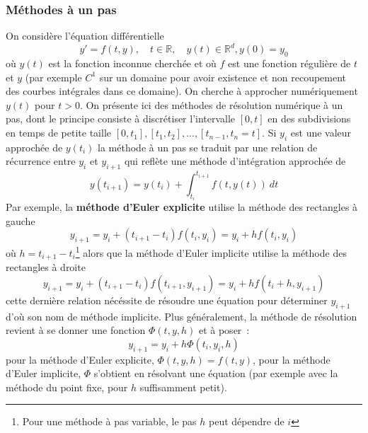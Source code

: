 \documentclass[a4paper,11pt]{article}
\newcommand{\R}{{\mathbb{R}}}
\begin{document}
\begin{giacjshere}
\subsubsection{Méthodes à un pas}
On considère l'équation différentielle 
$$y'=f(t,y), \quad t \in \R, \quad y(t) \in \R^d, y(0)=y_0$$ 
o\`u $y(t)$ est la fonction inconnue cherchée
et où $f$ est une fonction régulière de $t$ et $y$ (par exemple
$C^1$ sur un domaine pour avoir existence et non recoupement des courbes
int\'egrales dans ce domaine).  On cherche
à approcher numériquement $y(t)$ pour $t>0$. 
On présente ici des méthodes de résolution numérique à un pas,
dont le principe consiste à discrétiser l'intervalle $[0,t]$ en des
subdivisions en temps de petite taille $[0,t_1], [t_1,t_2], ..., 
[t_{n-1},t_n=t]$. Si $y_i$ est une valeur approchée de $y(t_i)$
la méthode à un pas se traduit par une relation de récurrence entre
$y_i$ et $y_{i+1}$ qui reflète une méthode d'intégration
approchée de
$$ y(t_{i+1})=y(t_i)+\int_{t_i}^{t_{i+1}} f(t,y(t)) \ dt$$
Par exemple, la {\bf méthode d'Euler explicite} 
utilise la méthode des
rectangles à gauche
$$ y_{i+1} = y_i + (t_{i+1}-t_i) f(t_i,y_i)=y_i+hf(t_i,y_i)$$
o\`u $h=t_{i+1}-t_i$\footnote{Pour une m\'ethode \`a pas variable,
le pas $h$ peut d\'ependre de $i$} 
alors que la méthode d'Euler implicite utilise la méthode 
des rectangles à droite
$$ y_{i+1} = y_i + (t_{i+1}-t_i) f(t_{i+1},y_{i+1})=y_i+hf(t_{i}+h,y_{i+1})$$
cette dernière relation nécéssite de résoudre une équation pour
déterminer $y_{i+1}$ d'où son nom de méthode implicite.
Plus g\'en\'eralement, la m\'ethode de r\'esolution revient \`a
se donner une fonction $\Phi(t,y,h)$ et \`a poser~:
$$ y_{i+1}=y_i+h\Phi(t_i,y_i,h)$$
pour la m\'ethode d'Euler explicite, $\Phi(t,y,h)=f(t,y)$, pour
la m\'ethode d'Euler implicite, $\Phi$ s'obtient en r\'esolvant une 
\'equation (par exemple avec la m\'ethode du point fixe, pour $h$
suffisamment petit).


\end{giacjshere}
\end{document}
